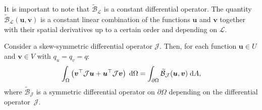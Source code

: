 It is important to note that $\widetilde{\mathcal{B}}_{\mathcal{L}}$ is a constant differential operator. The quantity $\widetilde{\mathcal{B}}_{\mathcal{L}}(\bm{u}, \bm{v})$ is a constant linear combination of the functions $\bm{u}$ and $\bm{v}$ together with their spatial derivatives up to a certain order and depending on $\mathcal{L}$.
\begin{corollary}
	Consider a skew-symmetric differential operator $\mathcal{J}$. Then, for each function $\bm{u} \in {U}$ and $\bm{v} \in {V}$ with $q_u = q_v = q$:
	\begin{equation}
	\int_{\Omega} \left( \bm{v}^\top \mathcal{J} \bm{u} + \bm{u}^\top \mathcal{J} \bm{v}\right) \d\Omega= \int_{\partial \Omega} \widetilde{\mathcal{B}}_{\mathcal{J}}(\bm{u}, \bm{v}) \d{A},
	\end{equation}
	where $\widetilde{\mathcal{B}}_{\mathcal{J}}$ is a symmetric differential operator on $\partial\Omega$ depending on the differential operator~$\mathcal{J}$.
\end{corollary}


